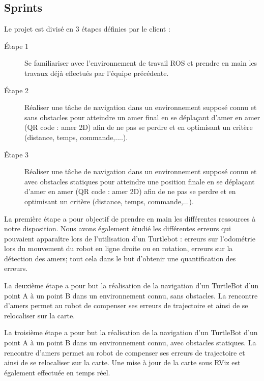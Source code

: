 \documentclass[10pt,a4paper]{article}
\begin{document}
\subsection{Sprints}

\noindent Le projet est divisé en 3 étapes définies par le client : 

\begin{description}

\item [Étape 1] Se familiariser avec l'environnement de travail ROS et prendre en main les travaux déjà effectués par l'équipe précédente.

\item [Étape 2] Réaliser une tâche de navigation dans un environnement supposé connu et sans obstacles pour atteindre un amer final en se déplaçant d’amer en amer (QR code : amer 2D) afin de ne pas se perdre et en optimisant un critère (distance, temps, commande,....).

\item [Étape 3] Réaliser une tâche de navigation dans un environnement supposé connu et avec obstacles statiques pour atteindre une position finale en se déplaçant d’amer en amer (QR code : amer 2D) afin de ne pas se perdre et en optimisant un critère (distance, temps, commande,...).

\end{description}

La première étape a pour objectif de prendre en main les différentes ressources à notre disposition. Nous avons également étudié les différentes erreurs qui pouvaient apparaître lors de l'utilisation d'un Turtlebot : erreurs sur l'odométrie lors du mouvement du robot en ligne droite ou en rotation, erreurs sur la détection des amers; tout cela dans le but d'obtenir une quantification des erreurs.

La deuxième étape a pour but la réalisation de la navigation d'un TurtleBot d'un point A à un point B dans un environnement connu, sans obstacles. La rencontre d'amers permet au robot de compenser ses erreurs de trajectoire et ainsi de se relocaliser sur la carte.

La troisième étape a pour but la réalisation de la navigation d'un TurtleBot d'un point A à un point B dans un environnement connu, avec obstacles statiques. La rencontre d'amers permet au robot de compenser ses erreurs de trajectoire et ainsi de se relocaliser sur la carte. Une mise à jour de la carte sous RViz est également effectuée en temps réel.
\end{document}
